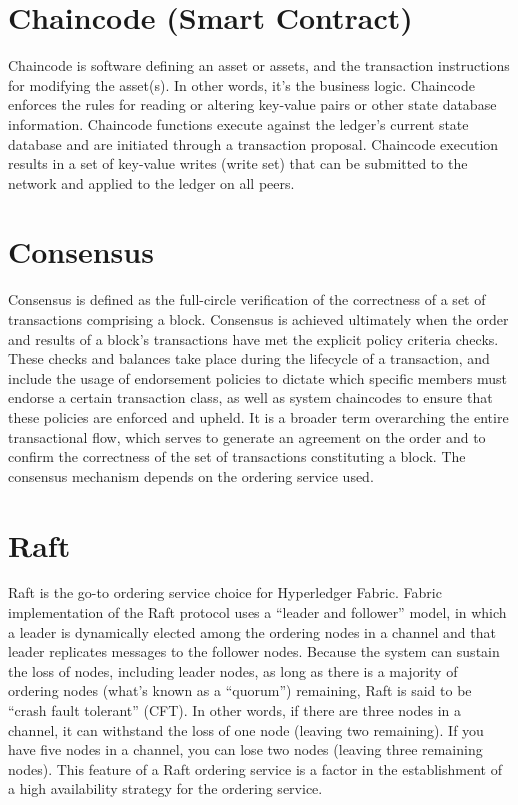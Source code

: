 \section{Chaincode (Smart Contract)}
Chaincode is software defining an asset or assets, and the transaction instructions for modifying the asset(s). In other words, it’s the business logic. Chaincode enforces the rules for reading or altering key-value pairs or other state database information. Chaincode functions execute against the ledger’s current state database and are initiated through a transaction proposal. Chaincode execution results in a set of key-value writes (write set) that can be submitted to the network and applied to the ledger on all peers.
\section{Consensus}
Consensus is defined as the full-circle verification of the correctness of a set of transactions comprising a block. Consensus is achieved ultimately when the order and results of a block’s transactions have met the explicit policy criteria checks. These checks and balances take place during the lifecycle of a transaction, and include the usage of endorsement policies to dictate which specific members must endorse a certain transaction class, as well as system chaincodes to ensure that these policies are enforced and upheld. It is a broader term overarching the entire transactional flow, which serves to generate an agreement on the order and to confirm the correctness of the set of transactions constituting a block. The consensus mechanism depends on the ordering service used.
\section{Raft}
Raft is the go-to ordering service choice for Hyperledger Fabric. Fabric implementation of the Raft protocol uses a “leader and follower” model, in which a leader is dynamically elected among the ordering nodes in a channel and that leader replicates messages to the follower nodes. Because the system can sustain the loss of nodes, including leader nodes, as long as there is a majority of ordering nodes (what’s known as a “quorum”) remaining, Raft is said to be “crash fault tolerant” (CFT). In other words, if there are three nodes in a channel, it can withstand the loss of one node (leaving two remaining). If you have five nodes in a channel, you can lose two nodes (leaving three remaining nodes). This feature of a Raft ordering service is a factor in the establishment of a high availability strategy for the ordering service.
